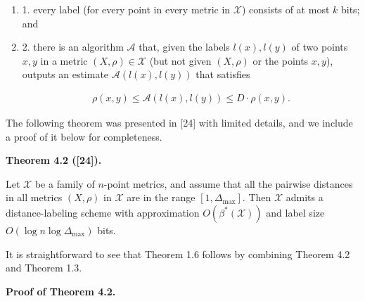 \par
\begin{enumerate}
\item  1. 
every label (for every point in every metric in $\mathcal{X}$) consists of at most $k$ bits; and
\par
\par
\item  2. 
there is an algorithm $\mathcal{A}$ that, given the labels $l(x),l(y)$ of two points $x,y$ in a metric $(X,\rho)\in\mathcal{X}$ (but not given $(X,\rho)$ or the points $x,y$), outputs an estimate $\mathcal{A}(l(x),l(y))$ that satisfies
\par
\[\begin{aligned}
\rho(x,y)\leq\mathcal{A}(l(x),l(y))\leq D\cdot\rho(x,y).
\end{aligned}\]
\par
\end{enumerate}
\par
\par
The following theorem was presented in [24] with limited details, and we include a proof of it below for completeness.
\par
\par
\par\medskip\noindent\textbf{Theorem 4.2 ([24]).}\par
Let $\mathcal{X}$ be a family of $n$-point metrics, and assume that all the pairwise distances in all metrics $(X,\rho)$ in $\mathcal{X}$ are in the range $[1,\Delta_{\text{max}}]$. Then $\mathcal{X}$ admits a distance-labeling scheme with approximation $O(\beta^{*}(\mathcal{X}))$ and label size $O(\log n\log\Delta_{\max})$ bits.
\par
\par
\par
It is straightforward to see that Theorem 1.6 follows by combining Theorem 4.2 and Theorem 1.3.
\par
\par
\par\medskip\noindent\textbf{Proof of Theorem 4.2.}\par

